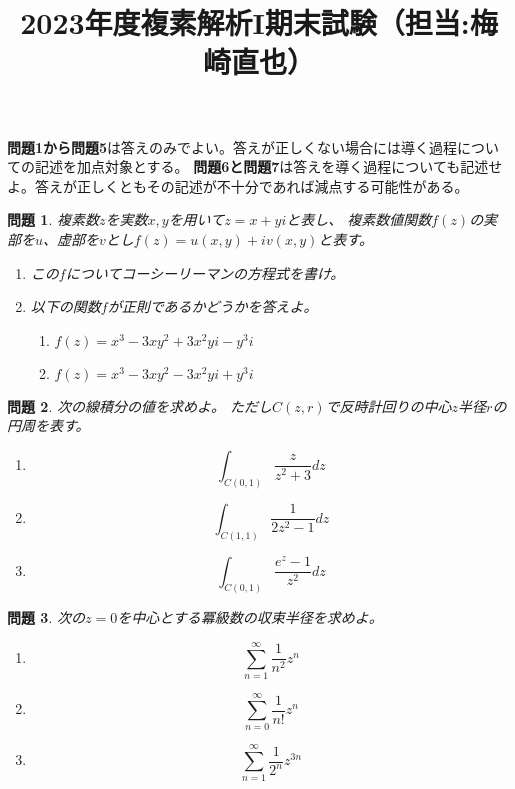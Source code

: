 \documentclass{ltjsarticle}
\title{2023年度複素解析I期末試験（担当:梅崎直也）}
\date{}
\newtheorem{prob}{問題}
\begin{document}
\maketitle
\vspace{-13mm}
\textbf{問題1から問題5}は答えのみでよい。答えが正しくない場合には導く過程についての記述を加点対象とする。
\textbf{問題6と問題7}は答えを導く過程についても記述せよ。答えが正しくともその記述が不十分であれば減点する可能性がある。

\begin{prob}
    複素数$z$を実数$x, y$を用いて$z=x+yi$と表し、
    複素数値関数$f(z)$の実部を$u$、虚部を$v$とし$f(z)=u(x,y)+iv(x,y)$と表す。
    \begin{enumerate}
        \item この$f$についてコーシーリーマンの方程式を書け。
        \item 以下の関数$f$が正則であるかどうかを答えよ。
        \begin{multicols}{2}
            \begin{enumerate}
                \item $f(z)=x^3-3xy^2+3x^2yi-y^3i$
                \item $f(z)=x^3-3xy^2-3x^2yi+y^3i$
            \end{enumerate}            
        \end{multicols}    

    \end{enumerate}
\end{prob}

\begin{prob}
    次の線積分の値を求めよ。
    ただし$C(z,r)$で反時計回りの中心$z$半径$r$の円周を表す。
    \begin{multicols}{3}
        \begin{enumerate}
            \item $$\int_{C(0,1)}\frac{z}{z^2+3}dz$$
            \item $$\int_{C(1,1)}\frac{1}{2z^2-1}dz$$
            \item $$\int_{C(0,1)}\frac{e^z-1}{z^2}dz$$
        \end{enumerate}
    \end{multicols}
\end{prob}

\begin{prob}
    次の$z=0$を中心とする冪級数の収束半径を求めよ。
    \begin{multicols}{3}
        \begin{enumerate}
            \item $$\sum_{n=1}^\infty\frac{1}{n^2}z^n$$
            \item $$\sum_{n=0}^\infty\frac{1}{n!}z^n$$
            \item $$\sum_{n=1}^\infty\frac{1}{2^n}z^{3n}$$
        \end{enumerate}
    \end{multicols}
\end{prob}
\end{document}
